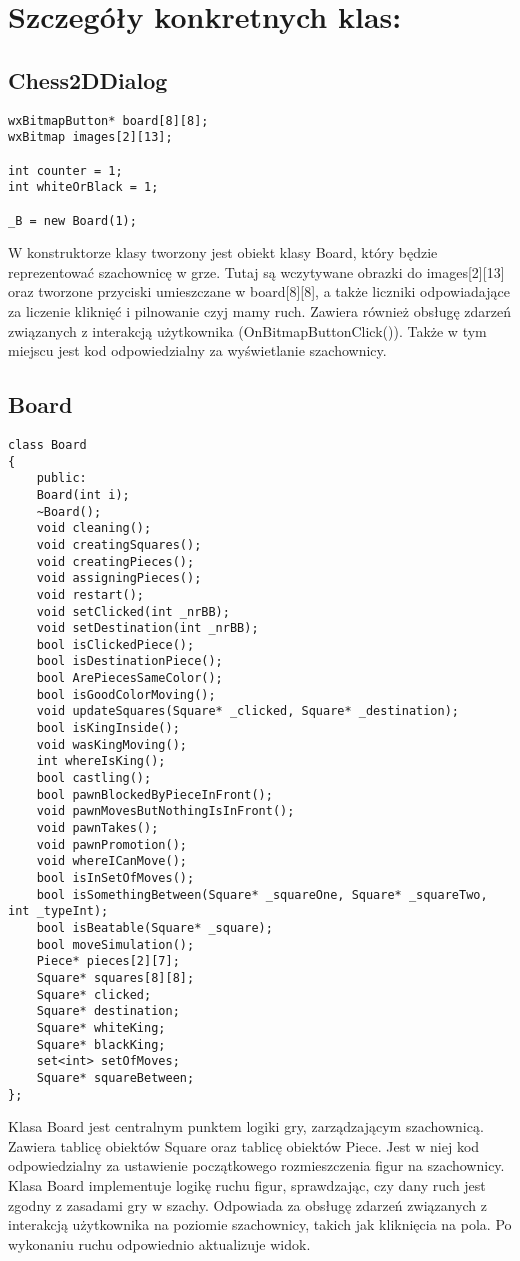 \documentclass[]{report}
\begin{document}
\section*{Szczegóły konkretnych klas:}

\subsection*{Chess2DDialog}

\begin{lstlisting}
wxBitmapButton* board[8][8];
wxBitmap images[2][13];

int counter = 1;
int whiteOrBlack = 1;

_B = new Board(1);

\end{lstlisting}
\begin{flushleft}
W konstruktorze klasy tworzony jest obiekt klasy Board, który będzie reprezentować szachownicę w grze. Tutaj są wczytywane obrazki do images[2][13] oraz tworzone przyciski umieszczane w board[8][8], a także liczniki odpowiadające za liczenie kliknięć i pilnowanie czyj mamy ruch. Zawiera również obsługę zdarzeń związanych z interakcją użytkownika (OnBitmapButtonClick()). Także w tym miejscu jest kod odpowiedzialny za wyświetlanie szachownicy.
\end{flushleft}
\subsection*{Board}

\begin{lstlisting}
class Board
{
	public:
	Board(int i);
	~Board();
	void cleaning();
	void creatingSquares();
	void creatingPieces();
	void assigningPieces();
	void restart();
	void setClicked(int _nrBB);
	void setDestination(int _nrBB);
	bool isClickedPiece();
	bool isDestinationPiece();
	bool ArePiecesSameColor();
	bool isGoodColorMoving();
	void updateSquares(Square* _clicked, Square* _destination);
	bool isKingInside();
	void wasKingMoving();
	int whereIsKing();
	bool castling();
	bool pawnBlockedByPieceInFront();
	void pawnMovesButNothingIsInFront();
	void pawnTakes();
	void pawnPromotion();
	void whereICanMove();
	bool isInSetOfMoves();
	bool isSomethingBetween(Square* _squareOne, Square* _squareTwo, int _typeInt);
	bool isBeatable(Square* _square);
	bool moveSimulation();
	Piece* pieces[2][7];
	Square* squares[8][8];
	Square* clicked;
	Square* destination;
	Square* whiteKing;
	Square* blackKing;
	set<int> setOfMoves;
	Square* squareBetween;
};

\end{lstlisting}
\begin{flushleft}
Klasa Board jest centralnym punktem logiki gry, zarządzającym szachownicą. Zawiera tablicę obiektów Square oraz tablicę obiektów Piece. Jest w niej kod odpowiedzialny za ustawienie początkowego rozmieszczenia figur na szachownicy. Klasa Board implementuje logikę ruchu figur, sprawdzając, czy dany ruch jest zgodny z zasadami gry w szachy. Odpowiada za obsługę zdarzeń związanych z interakcją użytkownika na poziomie szachownicy, takich jak kliknięcia na pola. Po wykonaniu ruchu odpowiednio aktualizuje widok.
\end{flushleft}
\end{document}
